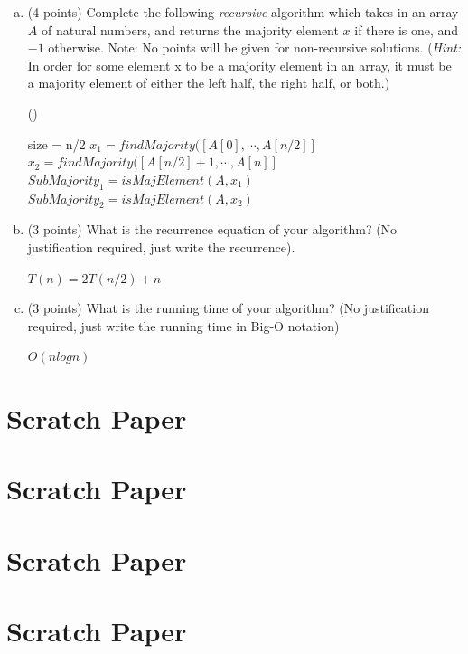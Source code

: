 \documentclass[12pt]{amsart}
\begin{document}
\begin{enumerate}[(a)]
\item(4 points) Complete the following \textit{recursive} algorithm which takes in an array $A$ of natural numbers, and returns the majority element $x$ if there is one, and $-1$ otherwise. Note: No points will be given for non-recursive solutions. ({\em Hint:} In order for some element x to be a majority element in an array, it must be a majority element of either the left half, the right half, or both.) 



\smallskip
\begin{algorithm}[H]
\Fn(){}{
\SetAlgoLined
\SetNoFillComment
\DontPrintSemicolon
	size = n/2\;
	$x_1 =  findMajority([A[0],\cdots, A[n/2]]$\\
	$x_2 = findMajority([A[n/2]+1,\cdots,A[n]]$\\
	$SubMajority_1 =isMajElement(A,x_1)$\;
	$SubMajority_2 =isMajElement(A,x_2)$\;
	
	\;
}
\end{algorithm}


\newpage

\item(3 points) What is the recurrence equation of your algorithm? (No justification required, just write the recurrence).

$T(n) = 2T(n/2) + n$\\
\vfill

\item(3 points) What is the running time of your algorithm? (No justification required, just write the running time in Big-O notation)

$O(nlogn)$
\vfill

\end{enumerate}

\newpage
\section*{Scratch Paper}

\pagebreak
\section*{Scratch Paper}

\pagebreak
\section*{Scratch Paper}


\pagebreak
\section*{Scratch Paper}


\end{document}
